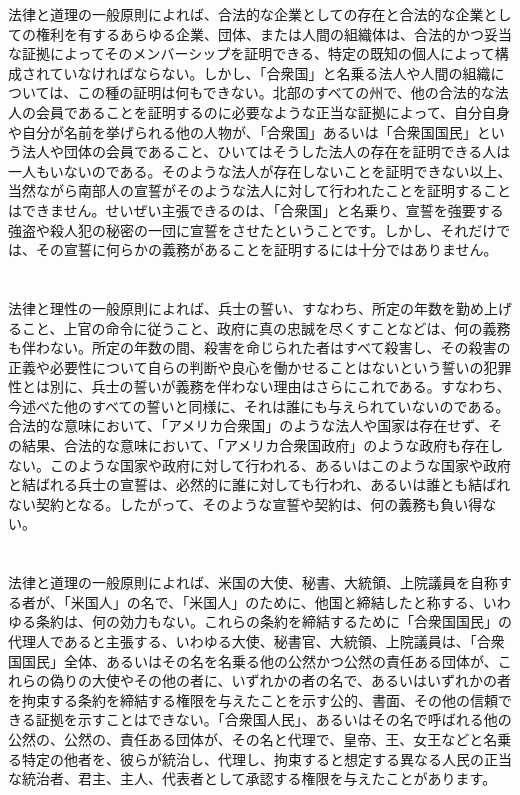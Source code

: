 \documentclass[dvipdfmx, uplatex, tate, landscape]{utbook}
\begin{document}
法律と道理の一般原則によれば、合法的な企業としての存在と合法的な企業としての権利を有するあらゆる企業、団体、または人間の組織体は、合法的かつ妥当な証拠によってそのメンバーシップを証明できる、特定の既知の個人によって構成されていなければならない。しかし、「合衆国」と名乗る法人や人間の組織については、この種の証明は何もできない。北部のすべての州で、他の合法的な法人の会員であることを証明するのに必要なような正当な証拠によって、自分自身や自分が名前を挙げられる他の人物が、「合衆国」あるいは「合衆国国民」という法人や団体の会員であること、ひいてはそうした法人の存在を証明できる人は一人もいないのである。そのような法人が存在しないことを証明できない以上、当然ながら南部人の宣誓がそのような法人に対して行われたことを証明することはできません。せいぜい主張できるのは、「合衆国」と名乗り、宣誓を強要する強盗や殺人犯の秘密の一団に宣誓をさせたということです。しかし、それだけでは、その宣誓に何らかの義務があることを証明するには十分ではありません。

\chapter{}

法律と理性の一般原則によれば、兵士の誓い、すなわち、所定の年数を勤め上げること、上官の命令に従うこと、政府に真の忠誠を尽くすことなどは、何の義務も伴わない。所定の年数の間、殺害を命じられた者はすべて殺害し、その殺害の正義や必要性について自らの判断や良心を働かせることはないという誓いの犯罪性とは別に、兵士の誓いが義務を伴わない理由はさらにこれである。すなわち、今述べた他のすべての誓いと同様に、それは誰にも与えられていないのである。合法的な意味において、「アメリカ合衆国」のような法人や国家は存在せず、その結果、合法的な意味において、「アメリカ合衆国政府」のような政府も存在しない。このような国家や政府に対して行われる、あるいはこのような国家や政府と結ばれる兵士の宣誓は、必然的に誰に対しても行われ、あるいは誰とも結ばれない契約となる。したがって、そのような宣誓や契約は、何の義務も負い得ない。

\chapter{}

法律と道理の一般原則によれば、米国の大使、秘書、大統領、上院議員を自称する者が、「米国人」の名で、「米国人」のために、他国と締結したと称する、いわゆる条約は、何の効力もない。これらの条約を締結するために「合衆国国民」の代理人であると主張する、いわゆる大使、秘書官、大統領、上院議員は、「合衆国国民」全体、あるいはその名を名乗る他の公然かつ公然の責任ある団体が、これらの偽りの大使やその他の者に、いずれかの者の名で、あるいはいずれかの者を拘束する条約を締結する権限を与えたことを示す公的、書面、その他の信頼できる証拠を示すことはできない。「合衆国人民」、あるいはその名で呼ばれる他の公然の、公然の、責任ある団体が、その名と代理で、皇帝、王、女王などと名乗る特定の他者を、彼らが統治し、代理し、拘束すると想定する異なる人民の正当な統治者、君主、主人、代表者として承認する権限を与えたことがあります。
\end{document}
